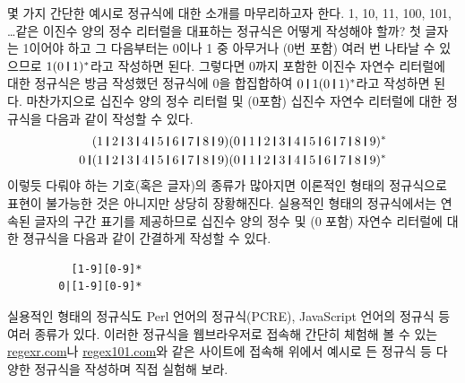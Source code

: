 \documentclass[b5paper,chapter,figtabcapt]{oblivoir}
\newcommand{\VERT}{\ensuremath{\mathop{\!\resizebox{1.65ex}{.7em}{\texttt{|}}\!}}}
\begin{document}
몇 가지 간단한 예시로 정규식에 대한 소개를 마무리하고자 한다.
1, 10, 11, 100, 101, \ldots 같은 이진수 양의 정수 리터럴을
대표하는 정규식은 어떻게 작성해야 할까? 첫 글자는 1이어야 하고
그 다음부터는 0이나 1 중 아무거나 (0번 포함) 여러 번 나타날 수
있으므로 $1(0\VERT{}1)^{*}$라고 작성하면 된다. 그렇다면 0까지 포함한
이진수 자연수 리터럴에 대한 정규식은 방금 작성했던 정규식에
0을 합집합하여 $0\VERT{}1(0\VERT{}1)^{*}$라고 작성하면 된다.
마찬가지으로 십진수 양의 정수 리터럴 및 (0포함)
십진수 자연수 리터럴에 대한 정규식을 다음과 같이 작성할 수 있다.
\vspace*{-1ex}
\begin{align*}
(1\VERT 2\VERT 3\VERT 4\VERT 5\VERT 6\VERT 7\VERT 8\VERT 9)
 (0\VERT 1\VERT 2\VERT 3\VERT 4\VERT 5\VERT 6\VERT 7\VERT 8\VERT 9)^{*} &
\\
0\VERT
 (1\VERT 2\VERT 3\VERT 4\VERT 5\VERT 6\VERT 7\VERT 8\VERT 9)
 (0\VERT 1\VERT 2\VERT 3\VERT 4\VERT 5\VERT 6\VERT 7\VERT 8\VERT 9)^{*} &
\end{align*}
이렇듯 다뤄야 하는 기호(혹은 글자)의 종류가 많아지면 이론적인 형태의
정규식으로 표현이 불가능한 것은 아니지만 상당히 장황해진다.
실용적인 형태의 정규식에서는 연속된 글자의 구간 표기를 제공하므로
십진수 양의 정수 및 (0 포함) 자연수 리터럴에 대한 졍규식을
다음과 같이 간결하게 작성할 수 있다.
\begin{verbatim}
          [1-9][0-9]*
        0|[1-9][0-9]*
\end{verbatim}
실용적인 형태의 정규식도 Perl 언어의 정규식(PCRE),
JavaScript 언어의 정규식 등 여러 종류가 있다.
이러한 정규식을 웹브라우저로 접속해 간단히 체험해 볼 수 있는
\href{https://regexr.com/}{regexr.com}나
\href{https://regex101.com/}{regex101.com}와 같은 사이트에 접속해
위에서 예시로 든 정규식 등 다양한 정규식을 작성하며 직접 실험해 보라.
\end{document}
